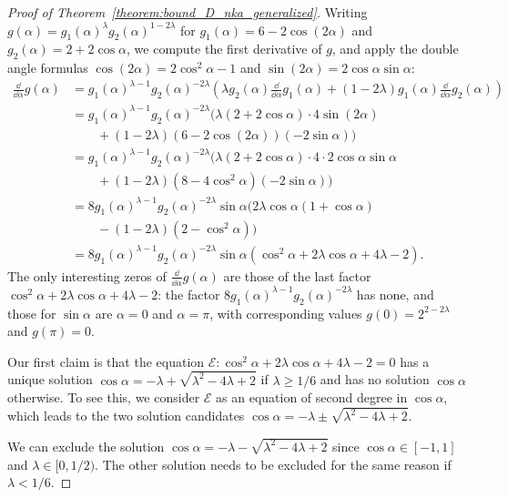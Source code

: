 \documentclass{llncs}
\begin{document}
\begin{proof}[Proof of Theorem~\ref{theorem:bound_D_nka_generalized}]
    Writing $g(\alpha)=g_1(\alpha)^{\lambda}g_2(\alpha)^{1-2\lambda}$ for $g_1(\alpha)=6-2\cos(2\alpha)$ and $g_2(\alpha)=2+2\cos\alpha$, we compute the first derivative of $g$, and apply the double angle formulas $\cos(2\alpha)=2\cos^2\alpha-1$ and $\sin(2\alpha)=2\cos\alpha\sin\alpha$:
    \begin{align*}
         \frac{\dd}{\dd\alpha}g(\alpha)&=g_1(\alpha)^{\lambda-1}g_2(\alpha)^{-2\lambda}\left(\lambda g_2(\alpha)\frac{\dd}{\dd\alpha}g_1(\alpha)+(1-2\lambda)g_1(\alpha)\frac{\dd}{\dd\alpha}g_2(\alpha)\right)\\
         &=g_1(\alpha)^{\lambda-1}g_2(\alpha)^{-2\lambda}(\lambda(2+2\cos\alpha)\cdot4\sin(2\alpha)\\
		 &\qquad+(1-2\lambda)(6-2\cos(2\alpha))(-2\sin\alpha))\\
         &=g_1(\alpha)^{\lambda-1}g_2(\alpha)^{-2\lambda}\big(\lambda(2+2\cos\alpha)\cdot4\cdot2\cos\alpha\sin\alpha\\
		 &\qquad+(1-2\lambda)\left(8-4\cos^2\alpha\right)(-2\sin\alpha)\big)\\
         &=8g_1(\alpha)^{\lambda-1}g_2(\alpha)^{-2\lambda}\sin\alpha\big(2\lambda \cos\alpha(1+\cos\alpha)\\
		 &\qquad-(1-2\lambda)\left(2-\cos^2\alpha\right)\big)\\
         &=8g_1(\alpha)^{\lambda-1}g_2(\alpha)^{-2\lambda}\sin\alpha\left(\cos^2\alpha+2\lambda\cos\alpha+4\lambda-2\right).
    \end{align*}
    The only interesting zeros of $\frac{\dd}{\dd\alpha}g(\alpha)$ are those of the last factor $\cos^2\alpha+2\lambda\cos\alpha+4\lambda-2$: the factor $8g_1(\alpha)^{\lambda-1}g_2(\alpha)^{-2\lambda}$ has none, and those for $\sin\alpha$ are $\alpha=0$ and $\alpha=\pi$, with corresponding values $g(0)=2^{2-2\lambda}$ and $g(\pi)=0$.
    
    Our first claim is that the equation $\mathcal E:\cos^2\alpha+2\lambda\cos\alpha+4\lambda-2=0$ has a unique solution $\cos\alpha=-\lambda+\sqrt{\lambda^2-4\lambda+2}$ if $\lambda\geq 1/6$ and has no solution $\cos\alpha$ otherwise. To see this, we consider $\mathcal E$ as an equation of second degree in $\cos\alpha$, which leads to the two solution candidates $\cos\alpha=-\lambda\pm\sqrt{\lambda^2-4\lambda+2}$.
     
    We can exclude the solution $\cos\alpha=-\lambda-\sqrt{\lambda^2-4\lambda+2}$ since $\cos\alpha\in[-1,1]$ and $\lambda\in [0,1/2)$. 
    The other solution needs to be excluded for the same reason if $\lambda<1/6$.


\end{proof}
\end{document}

